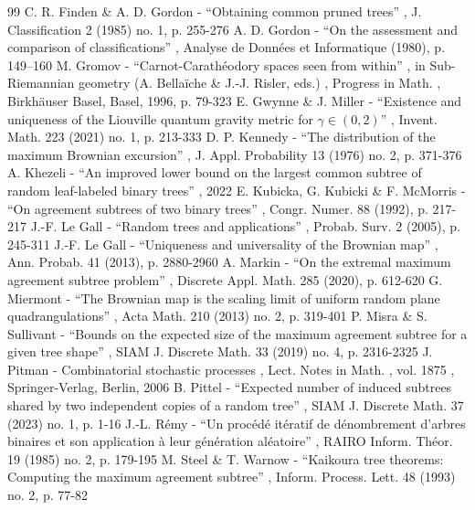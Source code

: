 \begin{thebibliography}{99}
 C. R. Finden \& A. D. Gordon - “Obtaining common pruned trees” , J. Classification 2 (1985) no. 1, p. 255-276
 A. D. Gordon - “On the assessment and comparison of classifications” , Analyse de Données et Informatique (1980), p. 149–160
 M. Gromov - “Carnot-Carathéodory spaces seen from within” , in Sub-Riemannian geometry (A. Bellaïche \& J.-J. Risler, eds.) , Progress in Math. , Birkhäuser Basel, Basel, 1996, p. 79-323
 E. Gwynne \& J. Miller - “Existence and uniqueness of the Liouville quantum gravity metric for $\gamma \in (0,2)$” , Invent. Math. 223 (2021) no. 1, p. 213-333
 D. P. Kennedy - “The distribution of the maximum Brownian excursion” , J. Appl. Probability 13 (1976) no. 2, p. 371-376
 A. Khezeli - “An improved lower bound on the largest common subtree of random leaf-labeled binary trees” , 2022
 E. Kubicka, G. Kubicki \& F. McMorris - “On agreement subtrees of two binary trees” , Congr. Numer. 88 (1992), p. 217-217
 J.-F. Le Gall - “Random trees and applications” , Probab. Surv. 2 (2005), p. 245-311
 J.-F. Le Gall - “Uniqueness and universality of the Brownian map” , Ann. Probab. 41 (2013), p. 2880-2960
 A. Markin - “On the extremal maximum agreement subtree problem” , Discrete Appl. Math. 285 (2020), p. 612-620
 G. Miermont - “The Brownian map is the scaling limit of uniform random plane quadrangulations” , Acta Math. 210 (2013) no. 2, p. 319-401
 P. Misra \& S. Sullivant - “Bounds on the expected size of the maximum agreement subtree for a given tree shape” , SIAM J. Discrete Math. 33 (2019) no. 4, p. 2316-2325
 J. Pitman - Combinatorial stochastic processes , Lect. Notes in Math. , vol. 1875 , Springer-Verlag, Berlin, 2006
 B. Pittel - “Expected number of induced subtrees shared by two independent copies of a random tree” , SIAM J. Discrete Math. 37 (2023) no. 1, p. 1-16
 J.-L. Rémy - “Un procédé itératif de dénombrement d’arbres binaires et son application à leur génération aléatoire” , RAIRO Inform. Théor. 19 (1985) no. 2, p. 179-195
 M. Steel \& T. Warnow - “Kaikoura tree theorems: Computing the maximum agreement subtree” , Inform. Process. Lett. 48 (1993) no. 2, p. 77-82
\end{thebibliography}
